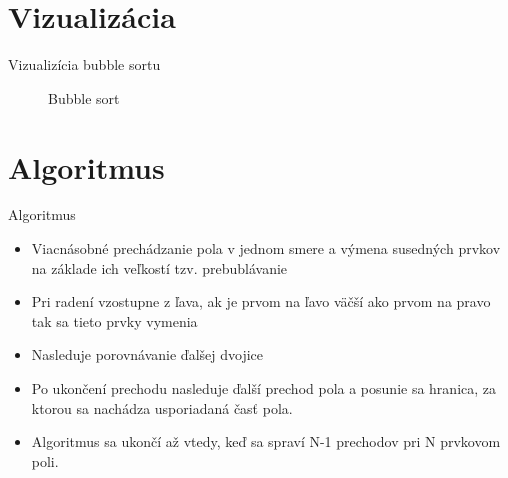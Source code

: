 \documentclass[10pt, hyperref={unicode}]{beamer}
\begin{document}
    \section{Vizualizácia}
    \begin{frame}{Vizualizícia bubble sortu}
        \begin{figure}
            \centering
            \caption{Bubble sort}
        \end{figure}
    
        
    \end{frame}
    
    \section{Algoritmus}
    \begin{frame}{Algoritmus}
        \begin{itemize}
            \item Viacnásobné prechádzanie pola v jednom smere a výmena susedných prvkov na základe ich veľkostí tzv. prebublávanie
            
            \item Pri radení vzostupne z ľava, ak je prvom na ľavo väčší ako prvom na pravo tak sa tieto prvky vymenia
            \item Nasleduje porovnávanie ďalšej dvojice
            \item Po ukončení prechodu nasleduje ďalší prechod pola a posunie sa hranica, za ktorou sa nachádza usporiadaná časť pola.
            \item Algoritmus sa ukončí až vtedy, keď sa spraví N-1 prechodov pri N prvkovom poli.
        \end{itemize}
    \end{frame}
\end{document}
